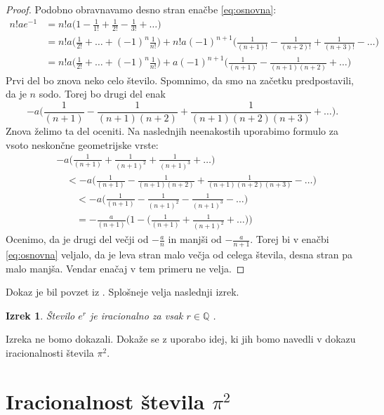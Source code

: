 \documentclass[a4paper]{article}
\theoremstyle{plain}
\newtheorem{izrek}{Izrek}
\newcommand{\pina}[1]{\pi^{#1}}
\begin{document}
\begin{proof}
Podobno obravnavamo desno stran enačbe \eqref{eq:osnovna}:
\begin{align*}
n!ae^{-1} &= n!a \bigg(1-\frac{1}{1!}+\frac{1}{2!}-\frac{1}{3!}+\dots \bigg) \\
&=n!a \bigg(\frac{1}{2!}+\dots+(-1)^n\frac{1}{n!}\bigg) + n!a (-1)^{n+1} \bigg( \frac{1}{(n+1)!}-\frac{1}{(n+2)!}+\frac{1}{(n+3)!}-\dots\bigg)\\
&=n!a \bigg(\frac{1}{2!}+\dots+(-1)^n\frac{1}{n!}\bigg) + a(-1)^{n+1} \bigg( \frac{1}{(n+1)}-\frac{1}{(n+1)(n+2)}+\dots\bigg)
\end{align*}
Prvi del bo znova neko celo število. Spomnimo, da smo na začetku predpostavili, da je $n$ sodo. Torej bo drugi del enak
\begin{equation*}
-a \bigg( \frac{1}{(n+1)}-\frac{1}{(n+1)(n+2)}+\frac{1}{(n+1)(n+2)(n+3)}+\dots\bigg).
\end{equation*}
Znova želimo ta del oceniti. Na naslednjih neenakostih uporabimo formulo za vsoto neskončne geometrijske vrste:
\begin{align*}
&-a \bigg( \frac{1}{(n+1)}+\frac{1}{(n+1)^2}+\frac{1}{(n+1)^3}+\dots\bigg) \\
&\quad < -a \bigg( \frac{1}{(n+1)}-\frac{1}{(n+1)(n+2)}+\frac{1}{(n+1)(n+2)(n+3)}-\dots\bigg) \\
&\quad \quad< -a \bigg( \frac{1}{(n+1)}-\frac{1}{(n+1)^2}-\frac{1}{(n+1)^3}-\dots\bigg) \\
&\quad \quad= - \frac{a}{(n+1)}\bigg(1 -\bigg(\frac{1}{(n+1)}+\frac{1}{(n+1)^2}+\dots\bigg)\bigg)
\end{align*}
Ocenimo, da je drugi del večji od $-\frac{a}{n}$ in manjši od $-\frac{a}{n+1}$. Torej bi v enačbi \eqref{eq:osnovna} veljalo, da je leva stran malo večja od celega števila, desna stran pa malo manjša. Vendar enačaj v tem primeru ne velja. 
\end{proof}

Dokaz je bil povzet iz \cite{dokazi}. Splošneje velja naslednji izrek.

\begin{izrek}
Število $e^r$ je iracionalno za vsak $r\in\mathbb{Q}$ .
\end{izrek}

Izreka ne bomo dokazali. Dokaže se z uporabo idej, ki jih bomo navedli v dokazu iracionalnosti števila $\pina{2}$.

\section*{Iracionalnost števila $\pi^2$}
\end{document}
